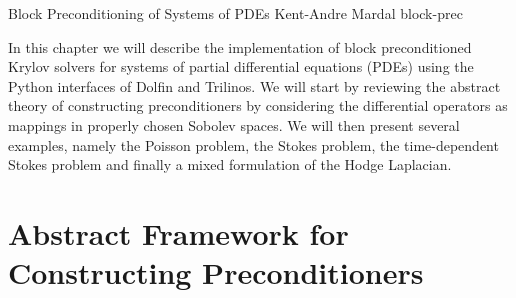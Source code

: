 

              {Block Preconditioning of Systems of PDEs}
              {Kent-Andre Mardal}
              {block-prec}
%




In this chapter we will describe the implementation of block preconditioned
Krylov solvers for systems of partial differential equations (PDEs) using
the Python interfaces of Dolfin and Trilinos. 
We will start by reviewing the
abstract theory of constructing preconditioners by considering the
differential operators as mappings in properly chosen Sobolev spaces. 
We will then
present several examples, namely the Poisson problem, the Stokes problem, 
the time-dependent Stokes problem and finally a mixed formulation
of the Hodge Laplacian. 

\section{Abstract Framework for Constructing Preconditioners}

